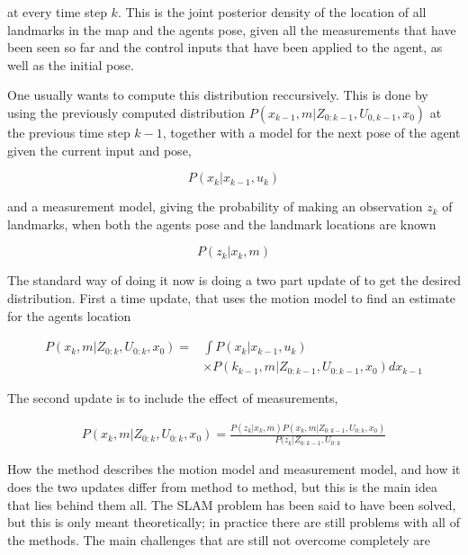 at every time step $k$. This is the joint posterior density of the location of all landmarks in the map and the agents pose, given all the measurements that have been seen so far and the control inputs that have been applied to the agent, as well as the initial pose. 

One usually wants to compute this distribution reccursively. This is done by using the previously computed distribution $P(x_{k-1},m|Z_{0:k-1},U_{0,k-1},x_0)$ at the previous time step $k-1$, together with a model for the next pose of the agent given the current input and pose, 

\begin{equation}
    P(x_k|x_{k-1},u_k)
\end{equation}

and a measurement model, giving the probability of making an observation $z_k$ of landmarks, when both the agents pose and the landmark locations are known

\begin{equation}
    P(z_k|x_k,m)
\end{equation}

The standard way of doing it now is doing a two part update of to get the desired distribution. First a time update, that uses the motion model to find an estimate for the agents location


\begin{align}
    P(x_k,m|Z_{0:k},U_{0:k}, x_0) 
     = & \int P(x_k|x_{k-1},u_k) \\
    & \times P(k_{k-1},m|Z_{0:k-1},U_{0:k-1},x_0)dx_{k-1}
\end{align}

The second update is to include the effect of measurements, 

\begin{equation}
\begin{split}
    P(x_k,m|Z_{0:k},U_{0:k},x_0) 
    = \frac{P(z_k|x_k,m)P(x_k,m|Z_{0:k-1},U_{0:k},x_0)}{P(z_k|Z_{0:k-1},U_{0:k}}
\end{split}
\end{equation}

How the method describes the motion model and measurement model, and how it does the two updates differ from method to method, but this is the main idea that lies behind them all. The SLAM problem has been said to have been solved, but this is only meant theoretically; in practice there are still problems with all of the methods. The main challenges that are still not overcome completely are 

